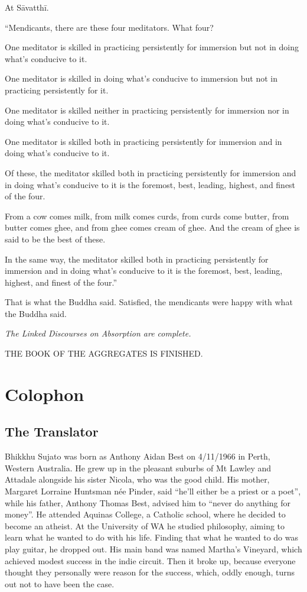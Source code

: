 \documentclass[12pt,openany]{book}%
\newcommand*{\scendsutta}[1]{\begin{center}\textit{#1}\end{center}}
\newcommand*{\scendbook}[1]{\begin{center}\uppercase{#1}\end{center}}
\let\oldbackmatter\backmatter
\renewcommand{\backmatter}{%
\chapterfont{\setstretch{.85}\normalfont\centering}%
\sectionfont{\setstretch{.85}\Semiboldsubheadfont}%
\oldbackmatter}
\begin{document}
At \textsanskrit{Sāvatthī}. 

“Mendicants, there are these four meditators. What four? 

One meditator is skilled in practicing persistently for immersion but not in doing what’s conducive to it. 

One meditator is skilled in doing what’s conducive to immersion but not in practicing persistently for it. 

One meditator is skilled neither in practicing persistently for immersion nor in doing what’s conducive to it. 

One meditator is skilled both in practicing persistently for immersion and in doing what’s conducive to it. 

Of these, the meditator skilled both in practicing persistently for immersion and in doing what’s conducive to it is the foremost, best, leading, highest, and finest of the four. 

From a cow comes milk, from milk comes curds, from curds come butter, from butter comes ghee, and from ghee comes cream of ghee. And the cream of ghee is said to be the best of these. 

In the same way, the meditator skilled both in practicing persistently for immersion and in doing what’s conducive to it is the foremost, best, leading, highest, and finest of the four.” 

That is what the Buddha said. Satisfied, the mendicants were happy with what the Buddha said. 

\scendsutta{The Linked Discourses on Absorption are complete. }

\scendbook{The Book of the Aggregates is finished. }

%
\backmatter%
\chapter*{Colophon}

\section*{The Translator}

Bhikkhu Sujato was born as Anthony Aidan Best on 4/11/1966 in Perth, Western Australia. He grew up in the pleasant suburbs of Mt Lawley and Attadale alongside his sister Nicola, who was the good child. His mother, Margaret Lorraine Huntsman née Pinder, said “he’ll either be a priest or a poet”, while his father, Anthony Thomas Best, advised him to “never do anything for money”. He attended Aquinas College, a Catholic school, where he decided to become an atheist. At the University of WA he studied philosophy, aiming to learn what he wanted to do with his life. Finding that what he wanted to do was play guitar, he dropped out. His main band was named Martha’s Vineyard, which achieved modest success in the indie circuit. Then it broke up, because everyone thought they personally were reason for the success, which, oddly enough, turns out not to have been the case. 
\end{document}
